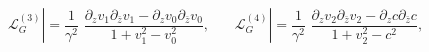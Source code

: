 \begin{equation}\label{Non-compact}
{\mathcal L}_G^{(3)} |=\frac{1}{\gamma^2}\,\,
 \frac{\partial_zv_1 \partial_{\bar z}v_1 -
\partial_zv_0\partial_{\bar z}v_0}{1+v_1^2 - v_0^2},~~~~~~~~
{\mathcal L}_G^{(4)} |=\frac{1}{\gamma^2}\,\,
 \frac{\partial_zv_2 \partial_{\bar z}v_2 -
\partial_zc\partial_{\bar z}c}{1+ v_2^2-c^2 },
\end{equation}

